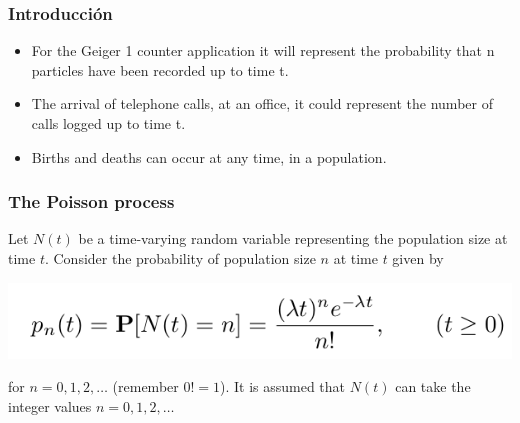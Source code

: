 \documentclass[spanish]{beamer}
\begin{document}
\begin{frame}
\frametitle{Introducción} 

\begin{itemize}
\item For the Geiger 1 counter application it will represent the probability that n particles have been recorded up to time t.

\item The arrival of telephone calls, at an office, it could represent the number of calls logged up to time t.

\item Births and deaths can occur at any time, in a population.
\end{itemize}

\end{frame}
\begin{frame}
\frametitle{The Poisson process}

Let $N (t)$ be a time-varying random variable representing the population size at time $t$. Consider the probability of population size $n$ at time $t$ given by

\begin{center}
\includegraphics[scale=0.4]{im1}
\end{center}

for $n = 0, 1, 2, \ldots$ (remember $0! = 1$). It is assumed that $                                                                                                                                                                                                                                                                                                                                                                                                                                                                                                                                                                          N (t)$ can take the integer values $n = 0, 1, 2, \ldots$

\end{frame}
\end{document}
